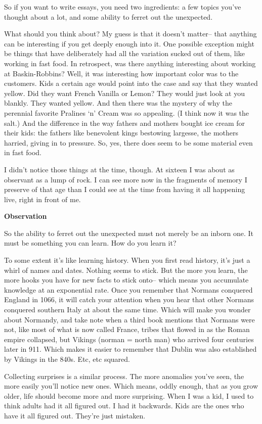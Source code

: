 \documentclass[12pt]{book}
\begin{document}
So if you want to write essays, you need two ingredients: a few topics
you've thought about a lot, and some ability to ferret out the
unexpected.

What should you think about? My guess is that it doesn't matter-- that
anything can be interesting if you get deeply enough into it. One
possible exception might be things that have deliberately had all the
variation sucked out of them, like working in fast food. In retrospect,
was there anything interesting about working at Baskin-Robbins? Well, it
was interesting how important color was to the customers. Kids a certain
age would point into the case and say that they wanted yellow. Did they
want French Vanilla or Lemon? They would just look at you blankly. They
wanted yellow. And then there was the mystery of why the perennial
favorite Pralines `n' Cream was so appealing. (I think now it was the
salt.) And the difference in the way fathers and mothers bought ice
cream for their kids: the fathers like benevolent kings bestowing
largesse, the mothers harried, giving in to pressure. So, yes, there
does seem to be some material even in fast food.

I didn't notice those things at the time, though. At sixteen I was about
as observant as a lump of rock. I can see more now in the fragments of
memory I preserve of that age than I could see at the time from having
it all happening live, right in front of me.

\textbf{Observation}

So the ability to ferret out the unexpected must not merely be an inborn
one. It must be something you can learn. How do you learn it?

To some extent it's like learning history. When you first read history,
it's just a whirl of names and dates. Nothing seems to stick. But the
more you learn, the more hooks you have for new facts to stick onto--
which means you accumulate knowledge at an exponential rate. Once you
remember that Normans conquered England in 1066, it will catch your
attention when you hear that other Normans conquered southern Italy at
about the same time. Which will make you wonder about Normandy, and take
note when a third book mentions that Normans were not, like most of what
is now called France, tribes that flowed in as the Roman empire
collapsed, but Vikings (norman = north man) who arrived four centuries
later in 911. Which makes it easier to remember that Dublin was also
established by Vikings in the 840s. Etc, etc squared.

Collecting surprises is a similar process. The more anomalies you've
seen, the more easily you'll notice new ones. Which means, oddly enough,
that as you grow older, life should become more and more surprising.
When I was a kid, I used to think adults had it all figured out. I had
it backwards. Kids are the ones who have it all figured out. They're
just mistaken.
\end{document}
